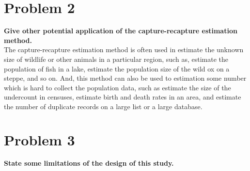 \documentclass[10pt,letterpaper]{article}
\begin{document}
\section*{Problem 2}
\textbf{Give other potential application of the capture-recapture estimation method.}\\

The capture-recapture estimation method is often used in estimate the unknown size of wildlife or other animals in a particular region, such as, estimate the population of fish in a lake, estimate the population size of the wild ox on a steppe, and so on. And, this method can also be used to estimation some number which is hard to collect the population data, such as estimate the size of the undercount in censuses, estimate birth and death rates in an area, and estimate the number of duplicate records on a large list or a large database.\\

\section*{Problem 3}
\textbf{State some limitations of the design of this study.}\\
\end{document}
